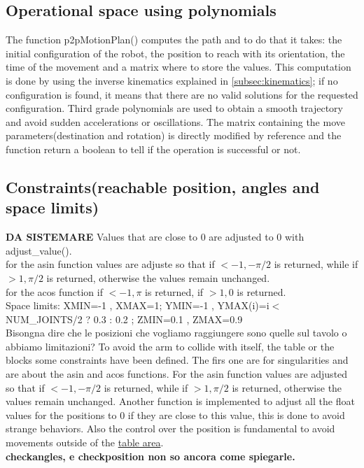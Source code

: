 \documentclass[12pt,a4paper]{article}
\begin{document}
\subsection{Operational space using polynomials}\label{subsec:opspace}
The function p2pMotionPlan() computes the path and to do that it takes: the initial configuration of the robot, the position to reach with its orientation, the time of the movement and a matrix where to store the values. This computation is done by using the inverse kinematics explained in \ref{subsec:kinematics}; if no configuration is found, it means that there are no valid solutions for the requested configuration. Third grade polynomials are used to obtain a smooth trajectory and avoid sudden accelerations or oscillations. The matrix containing the move parameters(destination and rotation) is directly modified by reference and the function return a boolean to tell if the operation is successful or not.

\subsection{Constraints(reachable position, angles and space limits)}\label{subsec:constraints}
\textbf{DA SISTEMARE} Values that are close to 0 are adjusted to 0 with adjust\_value().\\
for the asin function values are adjuste so that if $<-1, -\pi/2$ is returned, while if $>1, \pi/2$ is returned, otherwise the values remain unchanged.\\
for the acos function if $<-1, \pi$ is returned, if $>1, 0$ is returned.\\
Space limits: XMIN=-1 , XMAX=1; YMIN=-1 , YMAX(i)=i$<$NUM\_JOINTS/2 ? 0.3 : 0.2 ; ZMIN=0.1 , ZMAX=0.9\\
Bisongna dire che le posizioni che vogliamo raggiungere sono quelle sul tavolo o abbiamo limitazioni?
To avoid the arm to collide with itself, the table or the blocks some constraints have been defined. The firs one are for singularities and are about the asin and acos functions. For the asin function values are adjusted so that if $<-1, -\pi/2$ is returned, while if $>1, \pi/2$ is returned, otherwise the values remain unchanged. Another function is implemented to adjust all the float values for the positions to 0 if they are close to this value, this is done to avoid strange behaviors. Also the control over the position is fundamental to avoid movements outside of the \uline{table area}.\\
\textbf{checkangles, e checkposition non so ancora come spiegarle.}
\end{document}
